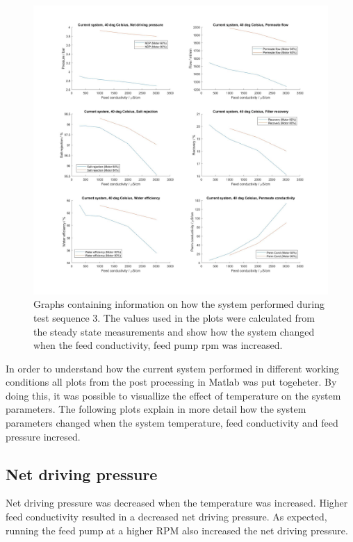 \begin{figure}[H]
    \centering
    \includegraphics[width=1.1\textwidth]{Key40}
    \caption{Graphs containing information on how the system performed during test sequence 3. The values used in the plots were calculated from the steady state measurements and show how the system changed when the feed conductivity, feed pump rpm was increased.}
    \label{fig:K40}
\end{figure}

\newpage

In order to understand how the current system performed in different working conditions all plots from the post processing in Matlab was put togeheter. By doing this, it was possible to visuallize the effect of temperature on the system parameters. The following plots explain in more detail how the system parameters changed when the system temperature, feed conductivity and feed pressure incresed.  

\subsection{Net driving pressure}

Net driving pressure was decreased when the temperature was increased. Higher feed conductivity resulted in a decreased net driving pressure. As expected, running the feed pump at a higher RPM also increased the net driving pressure.

